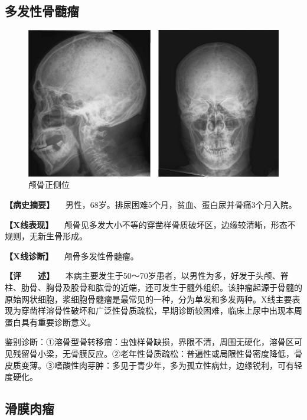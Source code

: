 \subsection{多发性骨髓瘤}

\begin{figure}[!htbp]
 \centering
 \includegraphics{./images/Image00104.jpg}
 \captionsetup{justification=centering}
 \caption{颅骨正侧位}
 \label{fig2-7-19}
  \end{figure} 

\textbf{【病史摘要】}
　男性，68岁。排尿困难5个月，贫血、蛋白尿并骨痛3个月入院。

\textbf{【X线表现】}
　颅骨见多发大小不等的穿凿样骨质破坏区，边缘较清晰，形态不规则，无新生骨形成。

\textbf{【X线诊断】} 　颅骨多发性骨髓瘤。

\textbf{【评　　述】}
　本病主要发生于50～70岁患者，以男性为多，好发于头颅、脊柱、肋骨、胸骨及股骨和肱骨的近端，还可发生于髓外组织。该肿瘤起源于骨髓的原始网状细胞，浆细胞骨髓瘤是最常见的一种，分为单发和多发两种。X线主要表现为穿凿样溶骨性破坏和广泛性骨质疏松，早期诊断较困难，临床上尿中出现本周蛋白具有重要诊断意义。

鉴别诊断：①溶骨型骨转移瘤：虫蚀样骨缺损，界限不清，周围无硬化，溶骨区可见残留骨小梁，无骨膜反应。②老年性骨质疏松：普遍性或局限性骨密度降低，骨皮质变薄。③嗜酸性肉芽肿：多见于青少年，多为孤立性病灶，边缘锐利，可有轻度硬化。

\subsection{滑膜肉瘤}

